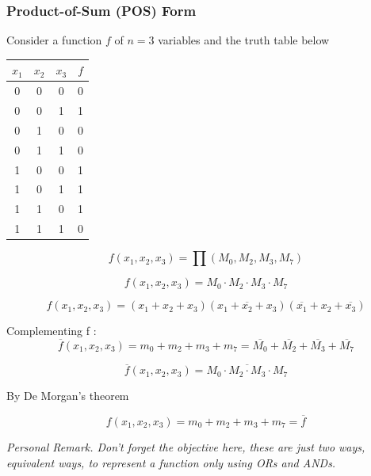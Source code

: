 \documentclass[12pt,openany]{book}
\begin{document}
			      	\subsubsection{Product-of-Sum (POS) Form}
			      	Consider a function \( f \) of \( n = 3 \) variables and the truth table below
			      	\begin{center}
			      		\begin{tabular}{ccc|c}
			      			\( x_1 \) & \( x_2 \) & \( x_3 \) & \( f \) \\
			      			\hline
			      			0         & 0         & 0         & 0       \\
			      			0         & 0         & 1         & 1       \\
			      			0         & 1         & 0         & 0       \\
			      			0         & 1         & 1         & 0       \\
			      			1         & 0         & 0         & 1       \\
			      			1         & 0         & 1         & 1       \\
			      			1         & 1         & 0         & 1       \\
			      			1         & 1         & 1         & 0       \\
			      		\end{tabular}
			      	\end{center}
			      	\[
			      		f(x_1, x_2, x_3) = \prod (M_0, M_2, M_3, M_7)
			      	\]
			      	
			      	\[
			      		f(x_1, x_2, x_3) = M_0 \cdot M_2 \cdot M_3 \cdot M_7
			      	\]
			      	
			      	\[
			      		f(x_1, x_2, x_3) = (x_1 + x_2 + x_3)(x_1 + \overline{x_2} + x_3)(\overline{x_1} + x_2 + \overline{x_3})
			      	\]
			      	
			      	
			      	Complementing f :
			      	\[
			      		\overline{f}(x_1, x_2, x_3) = m_0 + m_2 + m_3 + m_7 = \overline{M_0} + \overline{M_2} + \overline{M_3} + \overline{M_7}
			      	\]
			      	
			      	\[
			      		\overline{f}(x_1, x_2, x_3) = \overline{M_0 \cdot M_2 \cdot M_3 \cdot M_7}
			      	\]
			      	
			      	By De Morgan's theorem
			      	
			      	\[
			      		f(x_1, x_2, x_3) = m_0 + m_2 + m_3 + m_7 = \overline{f}
			      	\]
			      	
			      	\textit{Personal Remark. Don't forget the objective here, these are just two ways, equivalent ways, to represent a function only using ORs and ANDs.}
			      	
\end{document}
